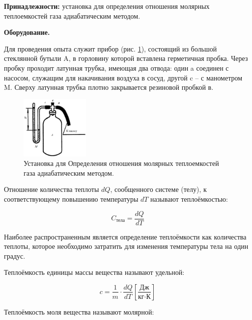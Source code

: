 \textbf{Принадлежности:} установка для определения отношения молярных теплоемкостей газа адиабатическим методом.

\begin{center}
    \textbf{Оборудование.}
\end{center}

Для проведения опыта служит прибор (рис. \ref{fig:установка 3.}), состоящий из большой стеклянной бутыли A, в горловину которой вставлена герметичная пробка. Через пробку проходит латунная трубка, имеющая два отвода: один a соединен с насосом, служащим для накачивания воздуха в сосуд, другой c – с манометром M. Сверху латунная трубка плотно закрывается резиновой пробкой в.

\begin{figure}[!h]
    \centering
    \includegraphics[width = 0.3\textwidth]{image/image3.png}
    
    \caption{Установка для Определения отношения молярных теплоемкостей газа адиабатическим методом.}
    
    \label{fig:установка 3.}
\end{figure}

Отношение количества теплоты $dQ$, сообщенного системе (телу), к соответствующему повышению температуры $dT$ называют теплоёмкостью:

\begin{equation}
    C_\text{тела} = \frac{d Q}{d T}
    \label{eq:formula_1}
\end{equation}

Наиболее распространенным является определение теплоёмкости как количества теплоты, которое необходимо затратить для изменения температуры тела на один градус.

Теплоёмкость единицы массы вещества называют удельной: 

\begin{equation*}
c = \frac{1}{m} \cdot \frac{d Q}{d T} [\frac{\text{Дж}}{\text{кг} \cdot \text{К}}]
\end{equation*}

Теплоёмкость моля вещества называют молярной:

